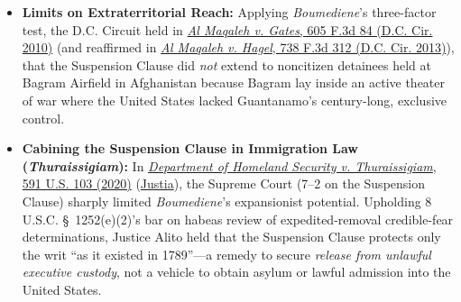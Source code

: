 \documentclass[12pt]{article}
\begin{document}
\begin{itemize}

\item \textbf{Limits on Extraterritorial Reach:} Applying \textit{Boumediene}'s three-factor test, the D.C. Circuit held in \href{https://caselaw.findlaw.com/court/us-dc-circuit/1524965.html}{\textit{Al Maqaleh v. Gates}, 605 F.3d 84 (D.C. Cir. 2010)} (and reaffirmed in \href{https://law.justia.com/cases/federal/appellate-courts/cadc/12-5404/12-5404-2013-12-24.html}{\textit{Al Maqaleh v. Hagel}, 738 F.3d 312 (D.C. Cir. 2013)}), that the Suspension Clause did \textit{not} extend to noncitizen detainees held at Bagram Airfield in Afghanistan because Bagram lay inside an active theater of war where the United States lacked Guantanamo's century-long, exclusive control.

\item \textbf{Cabining the Suspension Clause in Immigration Law (\textit{Thuraissigiam}):} In \href{https://www.law.cornell.edu/supremecourt/text/19-161}{\textit{Department of Homeland Security v. Thuraissigiam}, 591 U.S. 103 (2020)} (\href{https://supreme.justia.com/cases/federal/us/591/19-161/}{Justia}), the Supreme Court (7--2 on the Suspension Clause) sharply limited \textit{Boumediene}'s expansionist potential. Upholding 8 U.S.C. \S~1252(e)(2)'s bar on habeas review of expedited-removal credible-fear determinations, Justice Alito held that the Suspension Clause protects only the writ ``as it existed in 1789''---a remedy to secure \textit{release from unlawful executive custody}, not a vehicle to obtain asylum or lawful admission into the United States.

\end{itemize}
\end{document}
